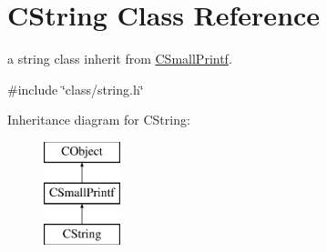 \hypertarget{class_c_string}{\section{C\-String Class Reference}
\label{class_c_string}
}


a string class inherit from \hyperlink{class_c_small_printf}{C\-Small\-Printf}.  




{\ttfamily \#include \char`\"{}class/string.\-h\char`\"{}}

Inheritance diagram for C\-String\-:\begin{figure}[H]
\begin{center}
\leavevmode
\includegraphics[height=3.000000cm]{df/d99/class_c_string}
\end{center}
\end{figure}
